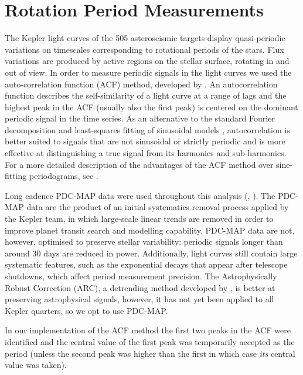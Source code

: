 \documentclass[10pt,preprint]{aastex}
\begin{document}
\section{Rotation Period Measurements}
\label{sec:rotation_period_measurement}

The Kepler light curves of the 505 asteroseismic targets display quasi-periodic variations on timescales corresponding to rotational periods of the stars.
Flux variations are produced by active regions on the stellar surface, rotating in and out of view.
In order to measure periodic signals in the light curves we used the auto-correlation function (ACF) method, developed by \citet{McQuillan2013}.
An autocorrelation function describes the self-similarity of a light curve at a range of lags and the highest peak in the ACF (usually also the first peak) is centered on the dominant periodic signal in the time series.
As an alternative to the standard Fourier decomposition and least-squares fitting of sinusoidal models \citep{Zechmeister}, autocorrelation is better suited to signals that are not sinusoidal or strictly periodic and is more effective at distinguishing a true signal from its harmonics and sub-harmonics.
For a more detailed description of the advantages of the ACF method over sine-fitting periodograms, see \citet{McQuillan}.

Long cadence PDC-MAP data were used throughout this analysis (\citet{Smith_2012}, \citet{Stumpe_2012}).
The PDC-MAP data are the product of an initial systematics removal process applied by the Kepler team, in which large-scale linear trends are removed in order to improve planet transit search and modelling capability.
PDC-MAP data are not, however, optimised to preserve stellar variability: periodic signals longer than around 30 days are reduced in power.
Additionally, light curves still contain large systematic features, such as the exponential decays that appear after telescope shutdowns, which affect period measurement precision.
The Astrophysically Robust Correction (ARC), a detrending method developed by \citet{Roberts2013}, is better at preserving astrophysical signals, however, it has not yet been applied to all Kepler quarters, so we opt to use PDC-MAP.

In our implementation of the ACF method the first two peaks in the ACF were identified and the central value of the first peak was temporarily accepted as the period (unless the second peak was higher than the first in which case {\it its} central value was taken).
\end{document}
